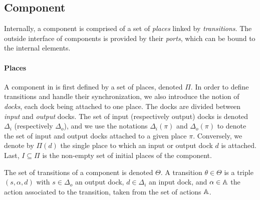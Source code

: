 \subsection{Component}

Internally, a \mad component is comprised of a set of \emph{places}
linked by \emph{transitions}. The outside interface of components is
provided by their \emph{ports}, which can be bound to the internal
elements.

\paragraph{Places}{

A component in \mad is first defined by a set of places, denoted
$\Pi$. In order to define transitions and handle their
synchronization, we also introduce the notion of \emph{docks}, each
dock being attached to one place. The docks are divided between
\emph{input} and \emph{output} docks. The set of input (respectively
output) docks is denoted $\Delta_i$ (respectively $\Delta_o$), and we
use the notations $\Delta_i (\pi)$ and $\Delta_o (\pi)$ to denote the
set of input and output docks attached to a given place
$\pi$. Conversely, we denote by $\Pi(d)$ the single place to which an
input or output dock $d$ is attached. Last, $I \subseteq \Pi$ is the
non-empty set of initial places of the component.

The set of transitions of a component is denoted
$\Theta$. A transition $\theta \in \Theta$ is a triple
$\left(s, \alpha, d\right)$ with $s\in\Delta_{o}$ an output dock,
$d\in\Delta_{i}$ an input dock, and $\alpha \in \mathbb{A}$ the action
associated to the transition, taken from the set of actions $\mathbb{A}$.
}

